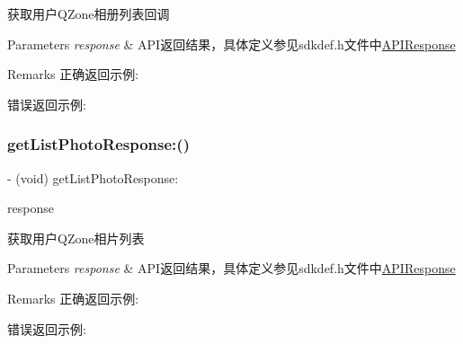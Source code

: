 获取用户\+Q\+Zone相册列表回调 
\begin{DoxyParams}{Parameters}
{\em response} & A\+P\+I返回结果，具体定义参见sdkdef.\+h文件中\mbox{\hyperlink{interface_a_p_i_response}{A\+P\+I\+Response}} \\
\hline
\end{DoxyParams}
\begin{DoxyRemark}{Remarks}
正确返回示例\+: 
\begin{DoxyCodeInclude}
\end{DoxyCodeInclude}
 错误返回示例\+: 
\begin{DoxyCodeInclude}
\end{DoxyCodeInclude}

\end{DoxyRemark}
\mbox{\label{protocol_tencent_session_delegate-p_a9730f3fa053bd0a0d0d6ab2ec8692671}} 
\subsubsection{\texorpdfstring{get\+List\+Photo\+Response\+:()}{getListPhotoResponse:()}\hspace{0.1cm}{\footnotesize\ttfamily [1/2]}}
{\footnotesize\ttfamily -\/ (void) get\+List\+Photo\+Response\+: \begin{DoxyParamCaption}\item[{(\mbox{\hyperlink{interface_a_p_i_response}{A\+P\+I\+Response}} $\ast$)}]{response }\end{DoxyParamCaption}\hspace{0.3cm}{\ttfamily [optional]}}

获取用户\+Q\+Zone相片列表 
\begin{DoxyParams}{Parameters}
{\em response} & A\+P\+I返回结果，具体定义参见sdkdef.\+h文件中\mbox{\hyperlink{interface_a_p_i_response}{A\+P\+I\+Response}} \\
\hline
\end{DoxyParams}
\begin{DoxyRemark}{Remarks}
正确返回示例\+: 
\begin{DoxyCodeInclude}
\end{DoxyCodeInclude}
 错误返回示例\+: 
\begin{DoxyCodeInclude}
\end{DoxyCodeInclude}

\end{DoxyRemark}
\mbox{\label{protocol_tencent_session_delegate-p_a9730f3fa053bd0a0d0d6ab2ec8692671}} 
